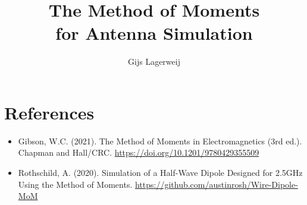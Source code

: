 \documentclass[a4paper, oneside, 12pt]{article}
\title{The Method of Moments\\for Antenna Simulation}
\author{Gijs Lagerweij}
\begin{document}
	\maketitle
	
	\tableofcontents
	
	
	
	
	
	\section*{References}
	\begin{itemize}
		\item Gibson, W.C. (2021). The Method of Moments in Electromagnetics (3rd ed.). Chapman and Hall/CRC. \url{https://doi.org/10.1201/9780429355509}
		\item Rothschild, A. (2020). Simulation of a Half-Wave Dipole Designed for 2.5GHz Using the Method of Moments. \url{https://github.com/austinrosh/Wire-Dipole-MoM}
	\end{itemize}
\end{document}
